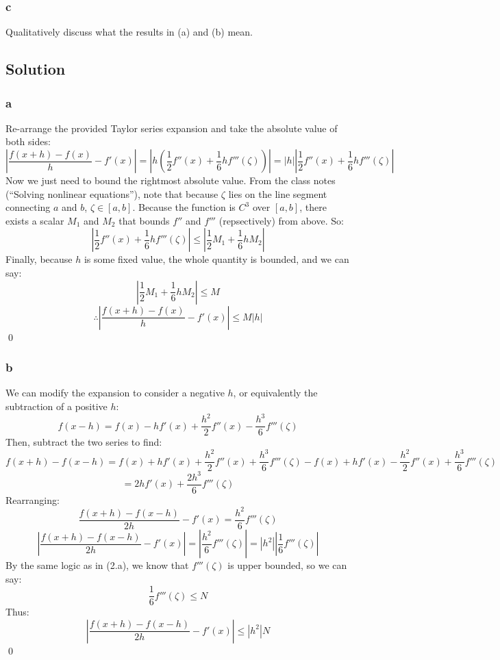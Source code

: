 \documentclass[11pt]{report}
\theoremstyle{definition}
\begin{document}
\subsubsection*{c}
Qualitatively discuss what the results in (a) and (b) mean.

\subsection*{Solution}
\subsubsection*{a}
Re-arrange the provided Taylor series expansion and take the absolute value of both sides:
\[
	\left|\frac{f(x+h)-f(x)}{h} - f'(x)\right|
	= \left|h(\frac{1}{2}f''(x)+\frac{1}{6}hf'''(\zeta))\right|
	= \left|h\right|\left|\frac{1}{2}f''(x)+\frac{1}{6}hf'''(\zeta)\right|
\]
Now we just need to bound the rightmost absolute value. From the class notes
(``Solving nonlinear equations''), note that because $\zeta$ lies on the line
segment connecting $a$ and $b$, $\zeta\in[a,b]$. Because the function is $C^3$
over $[a,b]$, there exists a scalar $M_1$ and $M_2$ that bounds $f''$ and $f'''$
(repsectively) from above. So:
\[
	\left|\frac{1}{2}f''(x)+\frac{1}{6}hf'''(\zeta)\right|
	\leq\left|\frac{1}{2}M_1 + \frac{1}{6}hM_2\right|
\]
Finally, because $h$ is some fixed value, the whole quantity is bounded, and we can say:
\[
	\left|\frac{1}{2}M_1 + \frac{1}{6}hM_2\right|
	\leq M
\]
\[
	\therefore
	\left|\frac{f(x+h)-f(x)}{h} - f'(x)\right|
	\leq M|h|
\]
\qed
\subsubsection*{b}
We can modify the expansion to consider a negative $h$, or equivalently the subtraction of
a positive $h$:
\[
	f(x-h) = f(x) - hf'(x) + \frac{h^2}{2}f''(x)-\frac{h^3}{6}f'''(\zeta)
\]
Then, subtract the two series to find:
\[
	f(x+h)-f(x-h)
	= f(x)+hf'(x)+\frac{h^2}{2}f''(x)+\frac{h^3}{6}f'''(\zeta)
	- f(x)+hf'(x)-\frac{h^2}{2}f''(x)+\frac{h^3}{6}f'''(\zeta)
\]
\[
	= 2hf'(x)+\frac{2h^3}{6}f'''(\zeta)
\]
Rearranging:
\[
	\frac{f(x+h)-f(x-h)}{2h} -f'(x)
	= \frac{h^2}{6}f'''(\zeta)
\]
\[
	\left|\frac{f(x+h)-f(x-h)}{2h} -f'(x)\right|
	= \left|\frac{h^2}{6}f'''(\zeta)\right|
	= \left|h^2\right|\left|\frac{1}{6}f'''(\zeta)\right|
\]
By the same logic as in (2.a), we know that $f'''(\zeta)$ is upper bounded, so we can say:
\[\frac{1}{6}f'''(\zeta)\leq N\]
Thus:
\[
	\left|\frac{f(x+h)-f(x-h)}{2h} -f'(x)\right|
	\leq \left|h^2\right|N
\]
\qed
\end{document}
